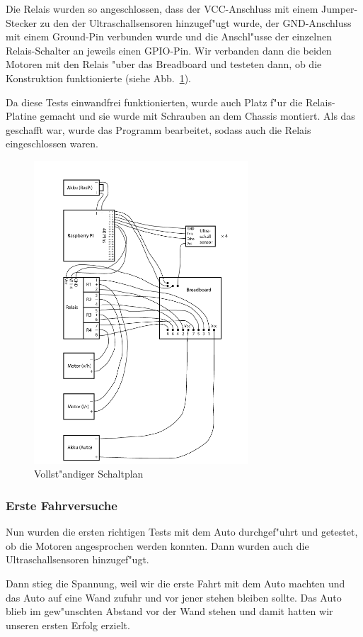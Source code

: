 \documentclass[a4paper,12pt]{article}
\begin{document}
Die Relais wurden so angeschlossen, dass der VCC-Anschluss mit einem Jumper-Stecker zu den der Ultraschallsensoren hinzugef"ugt wurde, der GND-Anschluss mit einem Ground-Pin verbunden wurde und die Anschl"usse der einzelnen Relais-Schalter an jeweils einen GPIO-Pin.
Wir verbanden dann die beiden Motoren mit den Relais "uber das Breadboard und testeten dann, ob die Konstruktion funktionierte (siehe Abb.~\ref{Fig3}).

Da diese Tests einwandfrei funktionierten, wurde auch Platz f"ur die Relais-Platine gemacht und sie wurde mit Schrauben an dem Chassis montiert.
Als das geschafft war, wurde das Programm bearbeitet, sodass auch die Relais eingeschlossen waren.

\begin{figure}[h]
	\centering
	\includegraphics[width=8cm]{./media/circuit.png}
	\caption{Vollst"andiger Schaltplan}
	\label{Fig3}
\end{figure}

\subsubsection{Erste Fahrversuche}\label{sec2.1.5}

Nun wurden die ersten richtigen Tests mit dem Auto durchgef"uhrt und getestet, ob die Motoren angesprochen werden konnten. Dann wurden auch die Ultraschallsensoren hinzugef"ugt.

Dann stieg die Spannung, weil wir die erste Fahrt mit dem Auto machten und das Auto auf eine Wand zufuhr und vor jener stehen bleiben sollte. Das Auto blieb im gew"unschten Abstand vor der Wand stehen und damit hatten wir unseren ersten Erfolg erzielt.
\end{document}
